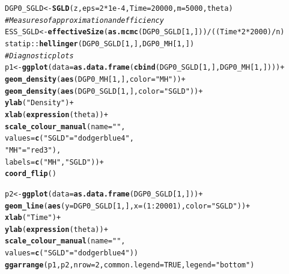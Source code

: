 \documentclass[11pt,a4paper]{report}\usepackage[]{graphicx}\usepackage[]{color}
\makeatletter
\newcommand{\hlnum}[1]{\textcolor[rgb]{0.686,0.059,0.569}{#1}}%
\newcommand{\hlstr}[1]{\textcolor[rgb]{0.192,0.494,0.8}{#1}}%
\newcommand{\hlcom}[1]{\textcolor[rgb]{0.678,0.584,0.686}{\textit{#1}}}%
\newcommand{\hlopt}[1]{\textcolor[rgb]{0,0,0}{#1}}%
\newcommand{\hlstd}[1]{\textcolor[rgb]{0.345,0.345,0.345}{#1}}%
\newcommand{\hlkwb}[1]{\textcolor[rgb]{0.69,0.353,0.396}{#1}}%
\newcommand{\hlkwc}[1]{\textcolor[rgb]{0.333,0.667,0.333}{#1}}%
\newcommand{\hlkwd}[1]{\textcolor[rgb]{0.737,0.353,0.396}{\textbf{#1}}}%
\newenvironment{kframe}{%
 \def\at@end@of@kframe{}%
 \ifinner\ifhmode%
  \def\at@end@of@kframe{\end{minipage}}%
  \begin{minipage}{\columnwidth}%
 \fi\fi%
 \def\FrameCommand##1{\hskip\@totalleftmargin \hskip-\fboxsep
 \colorbox{shadecolor}{##1}\hskip-\fboxsep
     \hskip-\linewidth \hskip-\@totalleftmargin \hskip\columnwidth}%
 \MakeFramed {\advance\hsize-\width
   \@totalleftmargin\z@ \linewidth\hsize
   \@setminipage}}%
 {\par\unskip\endMakeFramed%
 \at@end@of@kframe}
\newenvironment{knitrout}{}{} %
\makeatother
\begin{document}
\begin{appendix}
\begin{knitrout}
\begin{kframe}
\begin{alltt}
\hlstd{DGP0_SGLD}\hlkwb{<-}\hlkwd{SGLD}\hlstd{(z,} \hlkwc{eps}\hlstd{=}\hlnum{2}\hlopt{*}\hlnum{1e-4}\hlstd{,}\hlkwc{Time}\hlstd{=}\hlnum{20000}\hlstd{,}\hlkwc{m}\hlstd{=}\hlnum{5000}\hlstd{,theta)}
\hlcom{#Measures of approximation and efficiency}
\hlstd{ESS_SGLD}\hlkwb{<-}\hlkwd{effectiveSize}\hlstd{(}\hlkwd{as.mcmc}\hlstd{(DGP0_SGLD[}\hlnum{1}\hlstd{,]))}\hlopt{/}\hlstd{((Time}\hlopt{*}\hlnum{2}\hlopt{*}\hlnum{2000}\hlstd{)}\hlopt{/}\hlstd{n)}
\hlstd{statip}\hlopt{::}\hlkwd{hellinger}\hlstd{(DGP0_SGLD[}\hlnum{1}\hlstd{,],DGP0_MH[}\hlnum{1}\hlstd{,])}
\hlcom{#Diagnostic plots}
\hlstd{p1}\hlkwb{<-}\hlkwd{ggplot}\hlstd{(}\hlkwc{data}\hlstd{=}\hlkwd{as.data.frame}\hlstd{(}\hlkwd{cbind}\hlstd{(DGP0_SGLD[}\hlnum{1}\hlstd{,],DGP0_MH[}\hlnum{1}\hlstd{,])))}\hlopt{+}
  \hlkwd{geom_density}\hlstd{(}\hlkwd{aes}\hlstd{(DGP0_MH[}\hlnum{1}\hlstd{,],}\hlkwc{color}\hlstd{=}\hlstr{"MH"}\hlstd{))}\hlopt{+}
  \hlkwd{geom_density}\hlstd{(}\hlkwd{aes}\hlstd{(DGP0_SGLD[}\hlnum{1}\hlstd{,],}\hlkwc{color}\hlstd{=}\hlstr{"SGLD"}\hlstd{))}\hlopt{+}
  \hlkwd{ylab}\hlstd{(}\hlstr{"Density"}\hlstd{)}\hlopt{+}
  \hlkwd{xlab}\hlstd{(}\hlkwd{expression}\hlstd{(theta))}\hlopt{+}
  \hlkwd{scale_colour_manual}\hlstd{(}\hlkwc{name}\hlstd{=}\hlstr{""}\hlstd{,}
                      \hlkwc{values}\hlstd{=}\hlkwd{c}\hlstd{(}\hlstr{"SGLD"}\hlstd{=}\hlstr{"dodgerblue4"}\hlstd{,}
                               \hlstr{"MH"}\hlstd{=}\hlstr{"red3"}\hlstd{),}
                      \hlkwc{labels}\hlstd{=}\hlkwd{c}\hlstd{(}\hlstr{"MH"}\hlstd{,}\hlstr{"SGLD"}\hlstd{))}\hlopt{+}
  \hlkwd{coord_flip}\hlstd{()}

\hlstd{p2}\hlkwb{<-}\hlkwd{ggplot}\hlstd{(}\hlkwc{data}\hlstd{=}\hlkwd{as.data.frame}\hlstd{(DGP0_SGLD[}\hlnum{1}\hlstd{,]))}\hlopt{+}
  \hlkwd{geom_line}\hlstd{(}\hlkwd{aes}\hlstd{(}\hlkwc{y}\hlstd{=DGP0_SGLD[}\hlnum{1}\hlstd{,],} \hlkwc{x}\hlstd{=(}\hlnum{1}\hlopt{:}\hlnum{20001}\hlstd{),}\hlkwc{color}\hlstd{=}\hlstr{"SGLD"}\hlstd{))}\hlopt{+}
  \hlkwd{xlab}\hlstd{(}\hlstr{"Time"}\hlstd{)}\hlopt{+}
  \hlkwd{ylab}\hlstd{(}\hlkwd{expression}\hlstd{(theta))}\hlopt{+}
  \hlkwd{scale_colour_manual}\hlstd{(}\hlkwc{name}\hlstd{=}\hlstr{""}\hlstd{,}
                      \hlkwc{values}\hlstd{=}\hlkwd{c}\hlstd{(}\hlstr{"SGLD"}\hlstd{=}\hlstr{"dodgerblue4"}\hlstd{))}
\hlkwd{ggarrange}\hlstd{(p1, p2,} \hlkwc{nrow}\hlstd{=}\hlnum{2}\hlstd{,} \hlkwc{common.legend} \hlstd{=} \hlnum{TRUE}\hlstd{,} \hlkwc{legend}\hlstd{=}\hlstr{"bottom"}\hlstd{)}


\end{alltt}
\end{kframe}
\end{knitrout}
\end{appendix}
\end{document}
